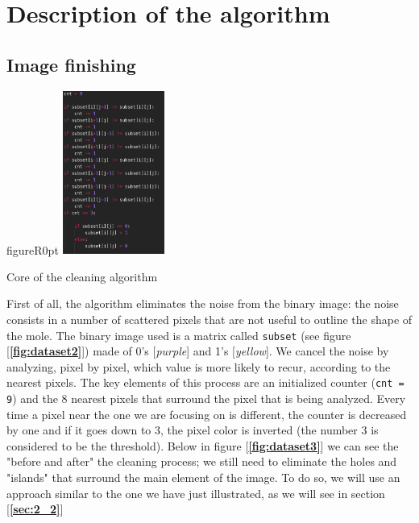 \documentclass[12pt]{report}
\begin{document}
\chapter{Description of the algorithm}

\section{Image finishing}\label{sec:2_1}

\begin{wrapfloat}{figure}{R}{0pt}
\includegraphics[width=0.25\textwidth]{clean.png}
\caption{Core of the cleaning algorithm}
\label{fig:dataset2} 
\end{wrapfloat}

First of all, the algorithm eliminates the noise from the binary image: the noise consists in a number of scattered pixels that are not useful to outline the shape of the mole. The binary image used is a matrix called \texttt{subset} (see figure [\textbf{\ref{fig:dataset2}}]) made of 0's [\textit{purple}] and 1's [\textit{yellow}]. We cancel the noise by analyzing, pixel by pixel, which value is more likely to recur, according to the nearest pixels. The key elements of this process are an initialized counter (\texttt{cnt = 9}) and the 8 nearest pixels that surround the pixel that is being analyzed. Every time a pixel near the one we are focusing on is different, the counter is decreased by one and if it goes down to 3, the pixel color is inverted (the number 3 is considered to be the threshold). Below in figure [\textbf{\ref{fig:dataset3}}] we can see the "before and after" the cleaning process; we still need to eliminate the holes and "islands" that surround the main element of the image. To do so, we will use an approach similar to the one we have just illustrated, as we will see in section [\textbf{\ref{sec:2_2}}]
\end{document}

